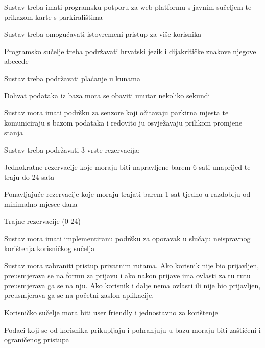 \begin{packed_item}
	
	\item Sustav treba imati programsku potporu za web platformu s javnim sučeljem te prikazom karte s parkiralištima
	\item Sustav treba omogućavati istovremeni pristup za više korisnika 
	\item Programsko sučelje treba podržavati hrvatski jezik i dijakritičke znakove njegove abecede
	\item Sustav treba podržavati plaćanje u kunama
	\item Dohvat podataka iz baza mora se obaviti unutar nekoliko sekundi
	\item Sustav mora imati podršku za senzore koji očitavaju parkirna mjesta te komuniciraju s bazom podataka i redovito ju osvježavaju prilikom promjene stanja
    \item Sustav treba podržavati 3 vrste rezervacija:
        	\item[] \begin{packed_enum}
		
		\item Jednokratne rezervacije koje moraju biti napravljene barem 6 sati unaprijed te traju do 24 sata
		\item Ponavljajuće rezervacije koje moraju trajati barem 1 sat tjedno u razdoblju od minimalno mjesec dana
		\item Trajne rezervacije (0-24)
		
	\end{packed_enum}
    \item Sustav mora imati implementiranu podršku za oporavak u slučaju neispravnog korištenja korisničkog sučelja
    \item Sustav mora zabraniti pristup privatnim rutama. Ako korisnik nije bio prijavljen, preusmjerava se na formu za prijavu i ako nakon prijave ima ovlasti za tu rutu preusmjerava ga se na nju. Ako korisnik i dalje nema ovlasti ili nije bio prijavljen, preusmjerava ga se na početni zaslon aplikacije.
    \item Korisničko sučelje mora biti user friendly i jednostavno za korištenje
    \item Podaci koji se od korisnika prikupljaju i pohranjuju u bazu moraju biti zaštićeni i ograničenog pristupa
\end{packed_item}